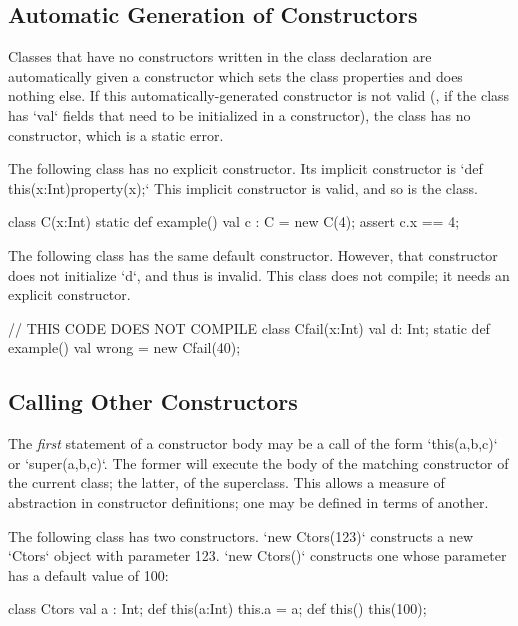 \subsection{Automatic Generation of Constructors}

Classes that have no constructors written in the class declaration are
automatically given a constructor which sets the class properties and does
nothing else. If this automatically-generated constructor is not valid (\eg,
if the class has \xcd`val` fields that need to be initialized in a
constructor), the class has no constructor, which is a static error.

\begin{ex}
The following class has no explicit constructor.
Its implicit constructor is 
\xcd`def this(x:Int){property(x);}`
This implicit constructor is valid, and so is the class. 
\begin{xten}
class C(x:Int) {
  static def example() {
    val c : C = new C(4);
    assert c.x == 4;
  }
}
\end{xten}
%
\noindent 


The following class has the same default constructor.  However, that
constructor does not initialize \xcd`d`, and thus is invalid.  This 
class does not compile; it needs an explicit constructor.
\begin{xten}
// THIS CODE DOES NOT COMPILE
class Cfail(x:Int) {
  val d: Int;
  static def example() {
    val wrong = new Cfail(40);
  }
}
\end{xten}
%


\end{ex}

\subsection{Calling Other Constructors}
\label{sect:call-another-ctor}

The {\em first} statement of a constructor body may be a call of the form 
\xcd`this(a,b,c)` or \xcd`super(a,b,c)`.  The former will execute the body of
the matching constructor of the current class; the latter, of the superclass. 
This allows a measure of abstraction in constructor definitions; one may be
defined in terms of another.

\begin{ex}
The following class has two constructors.  \xcd`new Ctors(123)` constructs a
new \xcd`Ctors` object with parameter 123.  \xcd`new Ctors()` constructs one
whose parameter has a default value of 100: 
\begin{xten}
class Ctors {
  val a : Int;
  def this(a:Int) { this.a = a; }
  def this() {
    this(100);
  }
}
\end{xten}
%
\end{ex}


